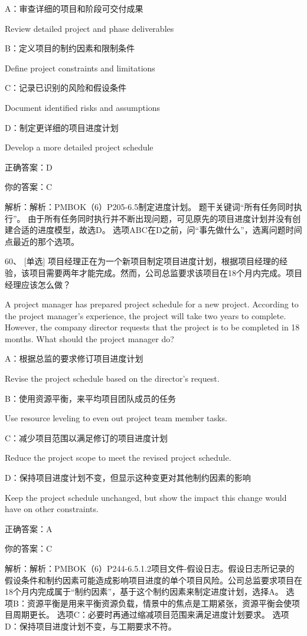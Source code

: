 A：审查详细的项目和阶段可交付成果

Review detailed project and phase deliverables

B：定义项目的制约因素和限制条件

Define project constraints and limitations

C：记录已识别的风险和假设条件

Document identified risks and assumptions

D：制定更详细的项目进度计划

Develop a more detailed project schedule

正确答案：D

你的答案：C

解析：解析：PMBOK（6）P205-6.5制定进度计划。 题干关键词“所有任务同时执行”。 由于所有任务同时执行并不断出现问题，可见原先的项目进度计划并没有创建合适的进度模型，故选D。 选项ABC在D之前，问“事先做什么”，选离问题时间点最近的那个选项。


60、 [单选] 项目经理正在为一个新项目制定项目进度计划，根据项目经理的经验，该项目需要两年才能完成。然而，公司总监要求该项目在18个月内完成。项目经理应该怎么做？

A project manager has prepared project schedule for a new project. According to the project manager’s experience, the project will take two years to complete. However, the company director requests that the project is to be completed in 18 months. What should the project manager do?

A：根据总监的要求修订项目进度计划

Revise the project schedule based on the director's request.

B：使用资源平衡，来平均项目团队成员的任务

Use resource leveling to even out project team member tasks.

C：减少项目范围以满足修订的项目进度计划

Reduce the project scope to meet the revised project schedule.

D：保持项目进度计划不变，但显示这种变更对其他制约因素的影响

Keep the project schedule unchanged, but show the impact this change would have on other constraints.

正确答案：A

你的答案：C

解析：解析：PMBOK（6）P244-6.5.1.2项目文件-假设日志。假设日志所记录的假设条件和制约因素可能造成影响项目进度的单个项目风险。公司总监要求项目在18个月内完成属于“制约因素”，基于这个制约因素来制定进度计划，选择A。 选项B：资源平衡是用来平衡资源负载，情景中的焦点是工期紧张，资源平衡会使项目周期更长。 选项C：必要时再通过缩减项目范围来满足进度计划要求。 选项D：保持项目进度计划不变，与工期要求不符。

